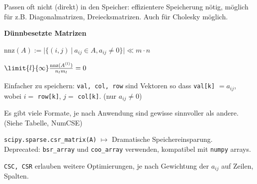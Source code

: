 \drmvspace
{}

Passen oft nicht (direkt) in den Speicher: effizientere Speicherung nötig, möglich für z.B. Diagonalmatrizen, Dreiecksmatrizen. Auch für Cholesky möglich.


\textbf{Dünnbesetzte Matrizen}

$\text{nnz}(A) := |\{ (i,j) \ |\ a_{ij} \in A, a_{ij} \neq 0 \}| \ll m\cdot n$

$\limit{l}{\infty} \frac{\text{nnz}(A^{(l)})}{n_l m_l} = 0$

Einfacher zu speichern: \verb|val, col, row| sind Vektoren so dass \verb|val[k]| $ = a_{ij}$, wobei $i=$ \verb|row[k]|, $j=$ \verb|col[k]|. (nur $a_{ij} \neq 0$)

Es gibt viele Formate, je nach Anwendung sind gewisse sinnvoller als andere. (Siehe Tabelle, NumCSE) %

\verb|scipy.sparse.csr_matrix(A)| $\mapsto$ Dramatische Speichereinsparung.\\
Deprecated: \verb|bsr_array| und \verb|coo_array| verwenden, kompatibel mit \verb|numpy| arrays.

\verb|CSC, CSR| erlauben weitere Optimierungen, je nach Gewichtung der $a_{ij}$ auf Zeilen, Spalten.
